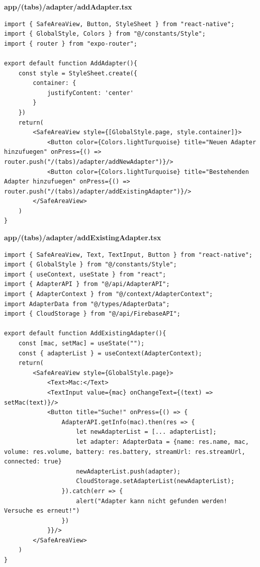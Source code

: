 \documentclass[11pt, twoside]{article}
\begin{document}
\textbf{app/(tabs)/adapter/addAdapter.tsx}
\begin{lstlisting}
import { SafeAreaView, Button, StyleSheet } from "react-native";
import { GlobalStyle, Colors } from "@/constants/Style";
import { router } from "expo-router";

export default function AddAdapter(){
    const style = StyleSheet.create({
        container: {
            justifyContent: 'center'
        }
    })
    return(
        <SafeAreaView style={[GlobalStyle.page, style.container]}>
            <Button color={Colors.lightTurquoise} title="Neuen Adapter hinzufuegen" onPress={() => router.push("/(tabs)/adapter/addNewAdapter")}/>
            <Button color={Colors.lightTurquoise} title="Bestehenden Adapter hinzufuegen" onPress={() => router.push("/(tabs)/adapter/addExistingAdapter")}/>
        </SafeAreaView>
    )
}
\end{lstlisting}

\textbf{app/(tabs)/adapter/addExistingAdapter.tsx}
\begin{lstlisting}
import { SafeAreaView, Text, TextInput, Button } from "react-native";
import { GlobalStyle } from "@/constants/Style";
import { useContext, useState } from "react";
import { AdapterAPI } from "@/api/AdapterAPI";
import { AdapterContext } from "@/context/AdapterContext";
import AdapterData from "@/types/AdapterData";
import { CloudStorage } from "@/api/FirebaseAPI";

export default function AddExistingAdapter(){
    const [mac, setMac] = useState("");
    const { adapterList } = useContext(AdapterContext);
    return(
        <SafeAreaView style={GlobalStyle.page}>
            <Text>Mac:</Text>
            <TextInput value={mac} onChangeText={(text) => setMac(text)}/> 
            <Button title="Suche!" onPress={() => {
                AdapterAPI.getInfo(mac).then(res => {
                    let newAdapterList = [... adapterList];
                    let adapter: AdapterData = {name: res.name, mac, volume: res.volume, battery: res.battery, streamUrl: res.streamUrl, connected: true}
                    newAdapterList.push(adapter);
                    CloudStorage.setAdapterList(newAdapterList);
                }).catch(err => {
                    alert("Adapter kann nicht gefunden werden! Versuche es erneut!")
                })
            }}/>
        </SafeAreaView>
    )
}
\end{lstlisting}
\end{document}
